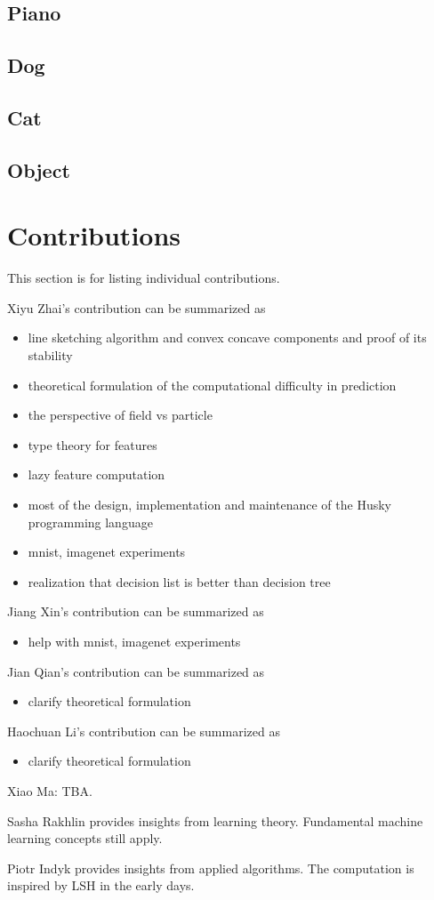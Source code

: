 \documentclass[11pt]{article} 	%
\theoremstyle{definition}
\begin{document}
\subsection{Piano}

\subsection{Dog}

\subsection{Cat}

\subsection{Object}

\section{Contributions}

This section is for listing individual contributions.

Xiyu Zhai's contribution can be summarized as
\begin{itemize}
	\item line sketching algorithm and convex concave components and proof of its stability
	\item theoretical formulation of the computational difficulty in prediction
	\item the perspective of field vs particle
	\item type theory for features
	\item lazy feature computation
	\item most of the design, implementation and maintenance of the Husky programming language
	\item mnist, imagenet experiments
	\item realization that decision list is better than decision tree
\end{itemize}

Jiang Xin's contribution can be summarized as
\begin{itemize}
	\item help with mnist, imagenet experiments
\end{itemize}

Jian Qian's contribution can be summarized as
\begin{itemize}
	\item clarify theoretical formulation
\end{itemize}

Haochuan Li's contribution can be summarized as
\begin{itemize}
	\item clarify theoretical formulation
\end{itemize}

Xiao Ma: TBA.

Sasha Rakhlin provides insights from learning theory. Fundamental machine learning concepts still apply.

Piotr Indyk provides insights from applied algorithms. The computation is inspired by LSH in the early days.


\end{document}
